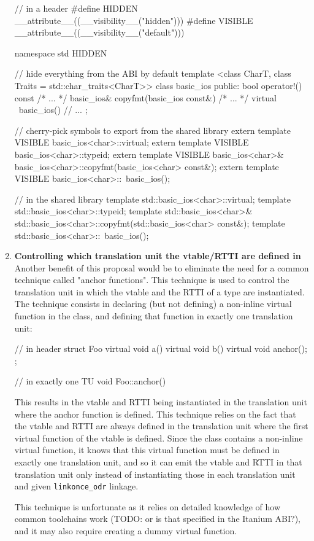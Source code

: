 \documentclass{wg21}
\newcommand{\cc}[1]{\texttt{#1}}
\begin{document}
\begin{enumerate}
  \begin{cpp}
  // in a header
  #define HIDDEN __attribute__((__visibility__("hidden")))
  #define VISIBLE __attribute__((__visibility__("default")))

  namespace std HIDDEN { // hide everything from the ABI by default
    template <class CharT, class Traits = std::char_traits<CharT>>
    class basic_ios {
    public:
      bool operator!() const { /* ... */ }
      basic_ios& copyfmt(basic_ios const&) { /* ... */ }
      virtual ~basic_ios() { }
      // ...
    };

    // cherry-pick symbols to export from the shared library
    extern template VISIBLE basic_ios<char>::virtual;
    extern template VISIBLE basic_ios<char>::typeid;
    extern template VISIBLE basic_ios<char>&
                            basic_ios<char>::copyfmt(basic_ios<char> const&);
    extern template VISIBLE basic_ios<char>::~basic_ios();
  }

  // in the shared library
  template std::basic_ios<char>::virtual;
  template std::basic_ios<char>::typeid;
  template std::basic_ios<char>&
           std::basic_ios<char>::copyfmt(std::basic_ios<char> const&);
  template std::basic_ios<char>::~basic_ios();
  \end{cpp}

  \item \textbf{Controlling which translation unit the vtable/RTTI are defined in}\\
  Another benefit of this proposal would be to eliminate the need for a common
  technique called "anchor functions". This technique is used to control the
  translation unit in which the vtable and the RTTI of a type are instantiated.
  The technique consists in declaring (but not defining) a non-inline virtual
  function in the class, and defining that function in exactly one translation
  unit:

  \begin{cpp}
  // in header
  struct Foo {
    virtual void a() { }
    virtual void b() { }
    virtual void anchor();
  };

  // in exactly one TU
  void Foo::anchor() { }
  \end{cpp}

  This results in the vtable and RTTI being instantiated in the translation unit
  where the anchor function is defined. This technique relies on the fact that
  the vtable and RTTI are always defined in the translation unit where the first
  virtual function of the vtable is defined. Since the class contains a non-inline
  virtual function, it knows that this virtual function must be defined in
  exactly one translation unit, and so it can emit the vtable and RTTI in that
  translation unit only instead of instantiating those in each translation unit
  and given \cc{linkonce_odr} linkage.

  This technique is unfortunate as it relies on detailed knowledge of how common
  toolchains work (TODO: or is that specified in the Itanium ABI?), and it may
  also require creating a dummy virtual function.
\end{enumerate}
\end{document}

